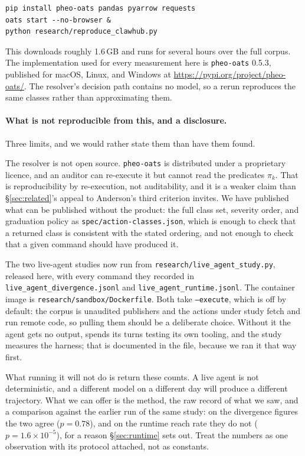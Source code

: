 \documentclass[10pt]{article}
\begin{document}
\begin{lstlisting}
pip install pheo-oats pandas pyarrow requests
oats start --no-browser &
python research/reproduce_clawhub.py
\end{lstlisting}

This downloads roughly 1.6\,GB and runs for several hours over the full corpus. The
implementation used for every measurement here is \texttt{pheo-oats} 0.5.3, published
for macOS, Linux, and Windows at \url{https://pypi.org/project/pheo-oats/}. The
resolver's decision path contains no model, so a rerun reproduces the same classes
rather than approximating them.

\paragraph{What is not reproducible from this, and a disclosure.} Three limits, and
we would rather state them than have them found.

The resolver is not open source. \texttt{pheo-oats} is distributed under a
proprietary licence, and an auditor can re-execute it but cannot read the predicates
$\pi_k$. That is reproducibility by re-execution, not auditability, and it is a
weaker claim than \S\ref{sec:related}'s appeal to Anderson's third criterion invites.
We have published what can be published without the product: the full class set,
severity order, and graduation policy as \texttt{spec/action-classes.json}, which is
enough to check that a returned class is consistent with the stated ordering, and not
enough to check that a given command should have produced it.

The two live-agent studies now run from \texttt{research/live\_agent\_study.py},
released here, with every command they recorded in
\texttt{live\_agent\_divergence.jsonl} and \texttt{live\_agent\_runtime.jsonl}. The
container image is \texttt{research/sandbox/Dockerfile}. Both take
\texttt{--execute}, which is off by default: the corpus is unaudited publishers and
the actions under study fetch and run remote code, so pulling them should be a
deliberate choice. Without it the agent gets no output, spends its turns testing its
own tooling, and the study measures the harness; that is documented in the file,
because we ran it that way first.

What running it will not do is return these counts. A live agent is not
deterministic, and a different model on a different day will produce a different
trajectory. What we can offer is the method, the raw record of what we saw, and a
comparison against the earlier run of the same study: on the divergence figures the
two agree ($p = 0.78$), and on the runtime reach rate they do not
($p = 1.6 \times 10^{-5}$), for a reason \S\ref{sec:runtime} sets out. Treat the
numbers as one observation with its protocol attached, not as constants.
\end{document}
